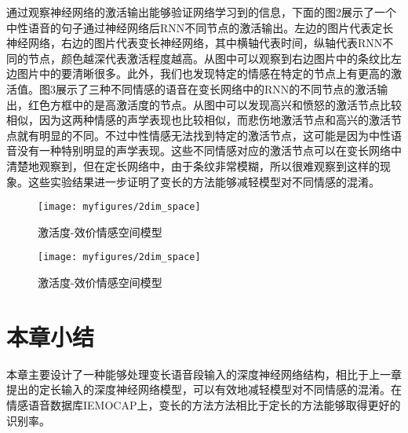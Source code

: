 通过观察神经网络的激活输出能够验证网络学习到的信息，下面的图2展示了一个中性语音的句子通过神经网络后RNN不同节点的激活输出。左边的图片代表定长神经网络，右边的图片代表变长神经网络，其中横轴代表时间，纵轴代表RNN不同的节点，颜色越深代表激活程度越高。从图中可以观察到右边图片中的条纹比左边图片中的要清晰很多。此外，我们也发现特定的情感在特定的节点上有更高的激活值。图3展示了三种不同情感的语音在变长网络中的RNN的不同节点的激活输出，红色方框中的是高激活度的节点。从图中可以发现高兴和愤怒的激活节点比较相似，因为这两种情感的声学表现也比较相似，而悲伤地激活节点和高兴的激活节点就有明显的不同。不过中性情感无法找到特定的激活节点，这可能是因为中性语音没有一种特别明显的声学表现。这些不同情感对应的激活节点可以在变长网络中清楚地观察到，但在定长网络中，由于条纹非常模糊，所以很难观察到这样的现象。这些实验结果进一步证明了变长的方法能够减轻模型对不同情感的混淆。

\begin{figure}[H] %
    \centering
    \texttt{[image: myfigures/2dim\_space]}
    \caption{激活度-效价情感空间模型}
    \label{fig:xfig1}
\end{figure}

\begin{figure}[H] %
    \centering
    \texttt{[image: myfigures/2dim\_space]}
    \caption{激活度-效价情感空间模型}
    \label{fig:xfig1}
\end{figure}

\section{本章小结}
\label{sec:var_len_summary}

本章主要设计了一种能够处理变长语音段输入的深度神经网络结构，相比于上一章提出的定长输入的深度神经网络模型，可以有效地减轻模型对不同情感的混淆。在情感语音数据库IEMOCAP上，变长的方法方法相比于定长的方法能够取得更好的识别率。